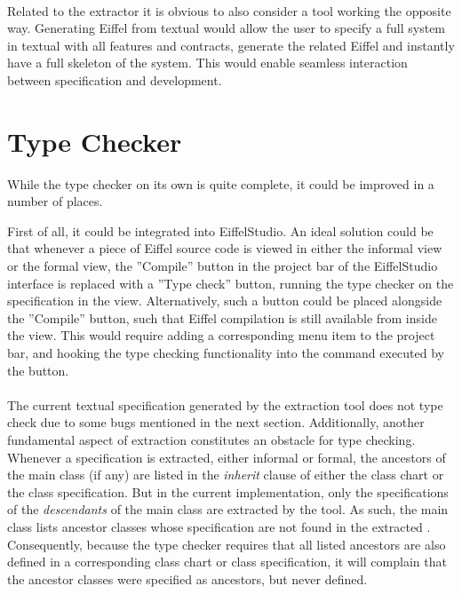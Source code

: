 \paragraph{}
Related to the \bon{} extractor it is obvious to also consider a tool working the opposite way. Generating Eiffel from textual \bon{} would allow the user to specify a full system in textual \bon{} with all features and contracts, generate the related Eiffel and instantly have a full skeleton of the system. This would enable seamless interaction between specification and development.

\section{Type Checker}
While the type checker on its own is quite complete, it could be improved in a number of places.

First of all, it could be integrated into EiffelStudio. An ideal solution could be that whenever a piece of Eiffel source code is viewed in either the informal \bon{} view or the formal \bon{} view, the ''Compile'' button in the project bar of the EiffelStudio interface is replaced with a ''Type check'' button, running the type checker on the specification in the view. Alternatively, such a button could be placed alongside the ''Compile'' button, such that Eiffel compilation is still available from inside the \bon{} view. This would require adding a corresponding menu item to the project bar, and hooking the type checking functionality into the command executed by the button.

\paragraph{}
The current textual \bon{} specification generated by the extraction tool does not type check due to some bugs mentioned in the next section. Additionally, another fundamental aspect of extraction constitutes an obstacle for type checking. Whenever a specification is extracted, either informal or formal, the ancestors of the main class (if any) are listed in the \textit{inherit} clause of either the class chart or the class specification. But in the current implementation, only the specifications of the \emph{descendants} of the main class are extracted by the tool. As such, the main class lists ancestor classes whose specification are not found in the extracted \bon{}. Consequently, because the type checker requires that all listed ancestors are also defined in a corresponding class chart or class specification, it will complain that the ancestor classes were specified as ancestors, but never defined.

